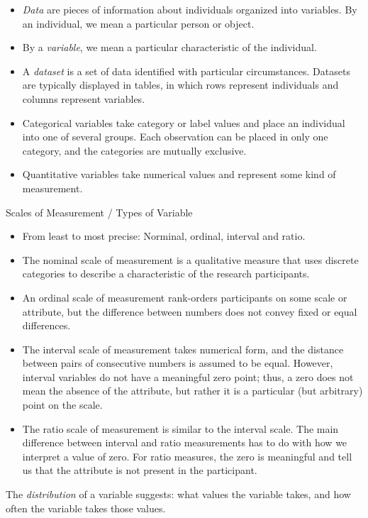 \documentclass[10pt, a4paper]{article}
\begin{document}
\begin{itemize}
\item
\emph{Data} are pieces of information about individuals organized into variables. By an individual, we mean a particular person or object. 
\item By a \emph{variable}, we mean a particular characteristic of the individual.
\item A \emph{dataset} is a set of data identified with particular circumstances. Datasets are typically displayed in tables, in which rows represent individuals and columns represent variables.
\item Categorical variables take category or label values and place an individual into one of several groups. Each observation can be placed in only one category, and the categories are mutually exclusive.
\item Quantitative variables take numerical values and represent some kind of measurement.
\end{itemize}
Scales of Measurement / Types of Variable
\begin{itemize}
\item From least to most precise: Norminal, ordinal, interval and ratio. 
\item The nominal scale of measurement is a qualitative measure that uses discrete categories to describe a characteristic of the research participants.
\item An ordinal scale of measurement rank-orders participants on some scale or attribute, but the difference between numbers does not convey fixed or equal differences.
\item 
  The interval scale of measurement takes numerical form, and the distance between pairs of consecutive numbers is assumed to be equal. However, interval variables do not have a meaningful zero point; thus, a zero does not mean the absence of the attribute, but rather it is a particular (but arbitrary) point on the scale.
\item 
The ratio scale of measurement is similar to the interval scale. The main difference between interval and ratio measurements has to do with how we interpret a value of zero. For ratio measures, the zero is meaningful and tell us that the attribute is not present in the participant. 
\end{itemize}
The \emph{distribution} of a variable suggests: what values the variable takes, and
how often the variable takes those values.\\[1mm]
\end{document}
